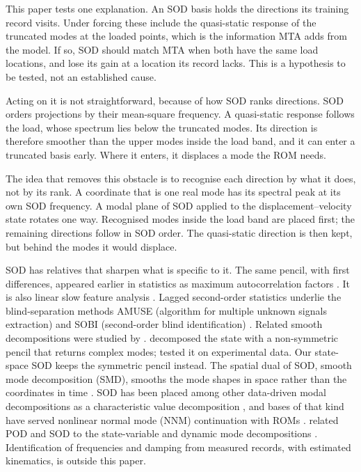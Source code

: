 \documentclass[preprint,12pt]{elsarticle}
\begin{document}
This paper tests one explanation. An SOD basis holds the directions its training record visits.
Under forcing these include the quasi-static response of the truncated modes at the loaded points, which is the information MTA adds from the model.
If so, SOD should match MTA when both have the same load locations, and lose its gain at a location its record lacks. This is a hypothesis to be tested, not an established cause.

Acting on it is not straightforward, because of how SOD ranks directions.
SOD orders projections by their mean-square frequency. A quasi-static response follows the load, whose spectrum lies below the truncated modes. Its direction is therefore smoother than the upper modes inside the load band, and it can enter a truncated basis early.
Where it enters, it displaces a mode the ROM needs.

The idea that removes this obstacle is to recognise each direction by what it does, not by its rank.
A coordinate that is one real mode has its spectral peak at its own SOD frequency. A modal plane of SOD applied to the displacement--velocity state rotates one way.
Recognised modes inside the load band are placed first; the remaining directions follow in SOD order.
The quasi-static direction is then kept, but behind the modes it would displace.

SOD has relatives that sharpen what is specific to it.
The same pencil, with first differences, appeared earlier in statistics as maximum autocorrelation factors \citep{Switzer1984,Shapiro1989}. It is also linear slow feature analysis \citep{Wiskott2002}. Lagged second-order statistics underlie the blind-separation methods AMUSE (algorithm for multiple unknown signals extraction) and SOBI (second-order blind identification) \citep{Tong1991,Belouchrani1997}. Related smooth decompositions were studied by \citet{Bellizzi2009,Bellizzi2012}.
\citet{Feeny2008} decomposed the state with a non-symmetric pencil that returns complex modes; \citet{Farooq2012} tested it on experimental data. Our state-space SOD keeps the symmetric pencil instead.
The spatial dual of SOD, smooth mode decomposition (SMD), smooths the mode shapes in space rather than the coordinates in time \citep{Li2023}. SOD has been placed among other data-driven modal decompositions as a characteristic value decomposition \citep{Li2025}, and bases of that kind have served nonlinear normal mode (NNM) continuation with ROMs \citep{Stein2025}. \citet{Khan2020} related POD and SOD to the state-variable and dynamic mode decompositions \citep{Schmid2010}.
Identification of frequencies and damping from measured records, with estimated kinematics, is outside this paper.
\end{document}
